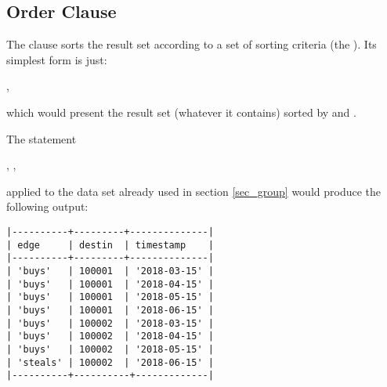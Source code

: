 

\subsection{Order Clause}
The  clause sorts the result set
according to a set of sorting criteria (the ).
Its simplest form is just:

 , 

which would present the result set (whatever it contains)
sorted by  and .

\begin{minipage}{\textwidth}
The statement

 , 
 
 , 
\end{minipage}

applied to the data set already used in section
\ref{sec_group} would produce the following output:

\begin{minipage}{\textwidth}
\begin{verbatim}
|----------+---------+--------------|
| edge     | destin  | timestamp    |
|----------+---------+--------------|
| 'buys'   | 100001  | '2018-03-15' |
| 'buys'   | 100001  | '2018-04-15' |
| 'buys'   | 100001  | '2018-05-15' |
| 'buys'   | 100001  | '2018-06-15' |
| 'buys'   | 100002  | '2018-03-15' |
| 'buys'   | 100002  | '2018-04-15' |
| 'buys'   | 100002  | '2018-05-15' |
| 'steals' | 100002  | '2018-06-15' |
|----------+----------+-------------|
\end{verbatim}
\end{minipage}

